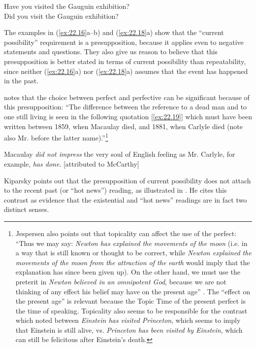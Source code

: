 \ea \label{ex:22.18}
\ea Have you visited the Gauguin exhibition?\\
\ex Did you visit the Gauguin exhibition?
                       \z
\z


The examples in (\ref{ex:22.16}a--b) and (\ref{ex:22.18}a) show that the “current possibility” requirement is a presupposition, because it applies even to negative statements and questions. They also give us reason to believe that this presupposition is better stated in terms of current possibility than repeatability, since neither  (\ref{ex:22.16}a) nor (\ref{ex:22.18}a) assumes that the event has happened in the past.



\citet[66--67]{Jespersen1931} notes that the choice between perfect and perfective can be significant because of this presupposition: “The difference between the reference to a dead man and to one still living is seen in the following quotation [\ref{ex:22.19}] which must have been written between 1859, when Macaulay died, and 1881, when Carlyle died (note also Mr. before the latter name).”\footnote{Jespersen also points out that topicality can affect the use of the perfect: “Thus we may say: \textit{Newton has explained the movements of the moon} (i.e. in a way that is still known or thought to be correct, while \textit{Newton explained the movements of the moon from the attraction of the earth} would imply that the explanation has since been given up). On the other hand, we must use the preterit in \textit{Newton believed in an omnipotent God}, because we are not thinking of any effect his belief may have on the present age” \citep[66]{Jespersen1931}. The “effect on the present age” is relevant because the Topic Time of the present perfect is the time of speaking. Topicality also seems to be responsible for the contrast which \citet{Chomsky1970} noted between \textit{Einstein has visited Princeton}, which seems to imply that Einstein is still alive, vs. \textit{Princeton has been visited by Einstein}, which can still be felicitous after Einstein’s death.}


\ea \label{ex:22.19}
Macaulay \textit{did not impress} the very soul of English feeling as Mr. Carlyle, for example, \textit{has done}. [attributed to McCarthy]
\z


Kiparsky points out that the presupposition of current possibility does not attach to the recent past (or “hot news”) reading, as illustrated in . He cites this contrast as evidence that the existential and “hot news” readings are in fact two distinct senses.


